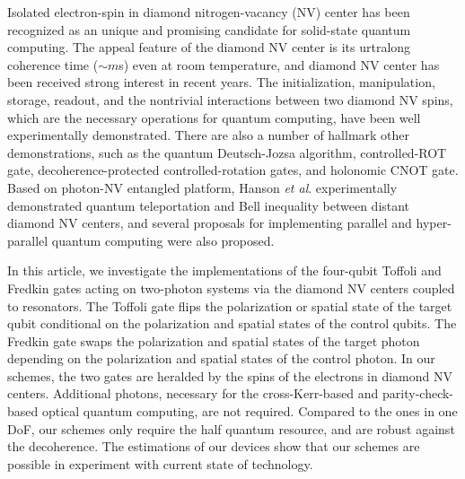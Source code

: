 \documentclass[showpacs,preprintnumbers,showkeys,amsmath,amssymb]{revtex4}%
\begin{document}
Isolated electron-spin in diamond nitrogen-vacancy (NV) center has been recognized as an unique and promising candidate for solid-state quantum computing. The appeal feature of the diamond NV center is its urtralong coherence time ($\sim m$s) even at room temperature\cite{coherence1,coherence2}, and diamond NV center has been received strong interest in recent years. The initialization\cite{population}, manipulation\cite{manipulation}, storage\cite{storage}, readout\cite{readout}, and the nontrivial interactions between two diamond NV spins\cite{Hanson1,Hanson2}, which are the necessary operations for quantum computing, have been well experimentally demonstrated. There are also a number of hallmark other demonstrations, such as the quantum Deutsch-Jozsa algorithm\cite{algorithm}, controlled-ROT gate\cite{controlled-ROT}, decoherence-protected controlled-rotation gates\cite{protected-gate}, and holonomic CNOT gate\cite{geometric1,geometric2}. Based on photon-NV entangled platform\cite{photon-NV-PRL1,photon-NV-PRL2}, Hanson \emph{et al}.\cite{Hanson2,Hanson3} experimentally demonstrated quantum teleportation and Bell inequality between distant diamond NV centers, and several proposals for implementing parallel and hyper-parallel quantum computing were also proposed\cite{Hyper-Toffoli-Wang,ourphotongate-NV,ourgates-NV,Wangchuan-NV}.




In this article, we investigate the implementations of the four-qubit Toffoli and Fredkin gates acting on two-photon systems via the diamond NV centers coupled to resonators. The Toffoli gate flips the polarization or spatial state of the target qubit conditional on the polarization and spatial states of the control qubits. The Fredkin gate swaps the polarization and spatial states of the target photon depending on the polarization and spatial states of the control photon. In our schemes, the two gates are heralded by the spins of the electrons in diamond NV centers. Additional  photons, necessary for the cross-Kerr-based and parity-check-based optical quantum computing, are not required. Compared to the ones in one DoF, our schemes only require the half quantum resource, and are robust against the decoherence. The estimations of our devices show that our schemes are possible in experiment with current state of technology.
\end{document}
